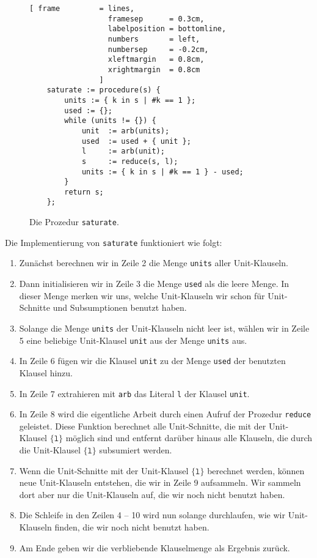 \begin{figure}[!ht]
  \centering
\begin{Verbatim}[ frame         = lines, 
                  framesep      = 0.3cm, 
                  labelposition = bottomline,
                  numbers       = left,
                  numbersep     = -0.2cm,
                  xleftmargin   = 0.8cm,
                  xrightmargin  = 0.8cm
                ]
    saturate := procedure(s) {
        units := { k in s | #k == 1 };
        used := {};
        while (units != {}) {
            unit  := arb(units);
            used  := used + { unit };
            l     := arb(unit);
            s     := reduce(s, l);
            units := { k in s | #k == 1 } - used;        
        }
        return s;
    };
\end{Verbatim}
\vspace*{-0.3cm}
  \caption{Die Prozedur \texttt{saturate}.}
  \label{fig:saturate}
\end{figure} 
Die Implementierung von \texttt{saturate} funktioniert wie folgt: 
\begin{enumerate}
\item Zun\"{a}chst berechnen wir in Zeile 2 die Menge \texttt{units} aller Unit-Klauseln.  
\item Dann initialisieren wir in Zeile 3 die Menge \texttt{used} als die leere Menge.
      In dieser Menge merken wir uns, welche Unit-Klauseln wir schon f\"{u}r Unit-Schnitte und
      Subsumptionen benutzt haben.
\item Solange die Menge \texttt{units} der Unit-Klauseln nicht leer ist, w\"{a}hlen wir in Zeile 5
      eine beliebige Unit-Klausel \texttt{unit} aus der Menge \texttt{units} aus.
\item In Zeile 6 f\"{u}gen wir die Klausel \texttt{unit} zu der Menge
      \texttt{used} der benutzten Klausel hinzu.  
\item In Zeile 7 extrahieren mit \texttt{arb} das Literal \texttt{l} der Klausel \texttt{unit}.  
\item In Zeile 8 wird  die eigentliche Arbeit durch einen Aufruf der Prozedur
      \texttt{reduce} geleistet.  Diese Funktion berechnet alle Unit-Schnitte, die mit der
      Unit-Klausel $\{\texttt{l}\}$ m\"{o}glich sind und entfernt dar\"{u}ber hinaus alle Klauseln, die
      durch die Unit-Klausel $\{\texttt{l}\}$ subsumiert werden.
\item Wenn die Unit-Schnitte mit der Unit-Klausel $\{\texttt{l}\}$ berechnet werden, k\"{o}nnen neue
      Unit-Klauseln entstehen, die wir in Zeile 9 aufsammeln.  Wir sammeln dort aber nur die Unit-Klauseln auf,
       die wir noch nicht benutzt haben. 
\item Die Schleife in den Zeilen 4 -- 10 wird nun solange durchlaufen, wie wir 
      Unit-Klauseln finden, die wir noch nicht benutzt haben.
\item Am Ende geben wir die verbliebende Klauselmenge als Ergebnis zur\"{u}ck.
\end{enumerate}
